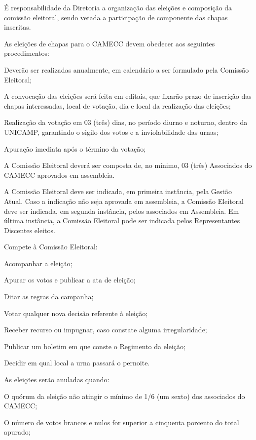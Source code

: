 \documentclass{estatuto}
\begin{document}

\artigo É responsabilidade da Diretoria a organização das eleições e composição da comissão eleitoral, sendo vetada a participação de componente das chapas inscritas.

\artigo As eleições de chapas para o CAMECC devem obedecer aos seguintes procedimentos:

\inciso Deverão ser realizadas anualmente, em calendário a ser formulado pela Comissão Eleitoral;

\inciso A convocação das eleições será feita em editais, que fixarão prazo de inscrição das chapas interessadas, local de votação, dia e local da realização das eleições;

\inciso Realização da votação em 03 (três) dias, no período diurno e noturno, dentro da UNICAMP, garantindo o sigilo dos votos e a inviolabilidade das urnas;

\inciso Apuração imediata após o término da votação;

\inciso A Comissão Eleitoral deverá ser composta de, no mínimo, 03 (três) Associados do CAMECC aprovados em assembleia.

\paragrafounico A Comissão Eleitoral deve ser indicada, em primeira instância, pela Gestão Atual. Caso a indicação não seja aprovada em assembleia, a Comissão Eleitoral deve ser indicada, em segunda instância, pelos associados em Assembleia. Em última instância, a Comissão Eleitoral pode ser indicada pelos Representantes Discentes eleitos.

\artigo Compete à Comissão Eleitoral:

\inciso Acompanhar a eleição;

\inciso Apurar os votos e publicar a ata de eleição;

\inciso Ditar as regras da campanha;

\inciso Votar qualquer nova decisão referente à eleição;

\inciso Receber recurso ou impugnar, caso constate alguma irregularidade;

\inciso Publicar um boletim em que conste o Regimento da eleição;

\inciso Decidir em qual local a urna passará o pernoite.

\artigo As eleições serão anuladas quando:

\inciso O quórum da eleição não atingir o mínimo de 1/6 (um sexto) dos associados do CAMECC;

\inciso O número de votos brancos e nulos for superior a cinquenta porcento do total apurado;
\end{document}

